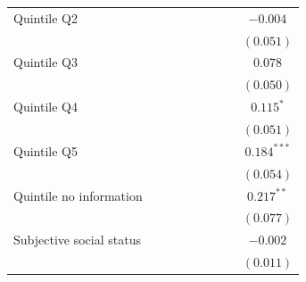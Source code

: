 \documentclass[
  12pt,
]{article}
\begin{document}
\begin{table}
\begin{center}
{\begin{tabular}{l c c c c c c c c}
\quad Quintile Q2                                     &               &                &                &                &                &                &                & $-0.004$       \\
                                                      &               &                &                &                &                &                &                & $(0.051)$      \\
\quad Quintile Q3                                     &               &                &                &                &                &                &                & $0.078$        \\
                                                      &               &                &                &                &                &                &                & $(0.050)$      \\
\quad Quintile Q4                                     &               &                &                &                &                &                &                & $0.115^{*}$    \\
                                                      &               &                &                &                &                &                &                & $(0.051)$      \\
\quad Quintile Q5                                     &               &                &                &                &                &                &                & $0.184^{***}$  \\
                                                      &               &                &                &                &                &                &                & $(0.054)$      \\
\quad Quintile no information                         &               &                &                &                &                &                &                & $0.217^{**}$   \\
                                                      &               &                &                &                &                &                &                & $(0.077)$      \\
Subjective social status                              &               &                &                &                &                &                &                & $-0.002$       \\
                                                      &               &                &                &                &                &                &                & $(0.011)$      \\

\end{tabular}}
\end{center}
\end{table}
\end{document}
